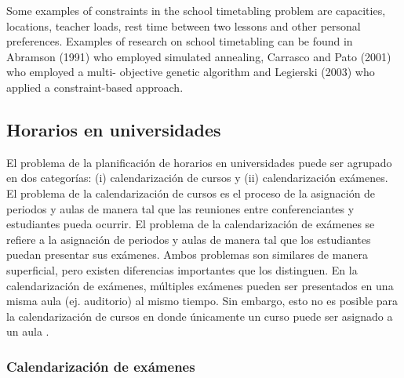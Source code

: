 \documentclass[draft,12pt,headsepline,footsepline,paper=letter]{scrreprt}
\begin{document}
Some examples of constraints in the school timetabling problem are capacities, locations, teacher loads, rest time between two lessons and other personal preferences. Examples of research on school timetabling can be found in Abramson (1991) who employed simulated annealing, Carrasco and Pato (2001) who employed a multi- objective genetic algorithm and Legierski (2003) who applied a constraint-based approach.
\fi

\subsection{Horarios en universidades}

El problema de la planificación de horarios en universidades puede ser agrupado en dos categorías: (i) calendarización de cursos y (ii) calendarización exámenes. 
El problema de la calendarización de cursos es el proceso de la asignación de periodos y aulas de manera tal que las reuniones entre conferenciantes y estudiantes pueda ocurrir. 
El problema de la calendarización de exámenes se refiere a la asignación de periodos y aulas de manera tal que los estudiantes puedan presentar sus exámenes. 
Ambos problemas son similares de manera superficial, pero existen diferencias importantes que los distinguen. 
En la calendarización de exámenes, múltiples exámenes pueden ser presentados en una misma aula (ej. auditorio) al mismo tiempo. 
Sin embargo, esto no es posible para la calendarización de cursos en donde únicamente un curso puede ser asignado a un aula \citep[p.~11]{abdullah06heuristic-approaches}.

\subsubsection{Calendarización de exámenes}
\end{document}
